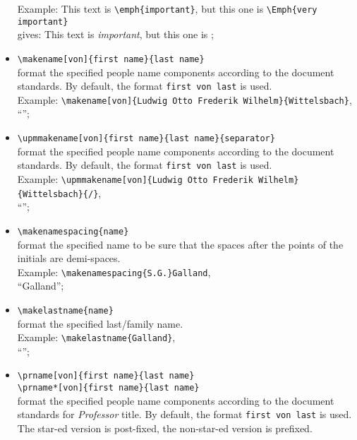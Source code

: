 \documentclass[book]{upmethodology-document}
\begin{document}
\begin{itemize}
	Example: This text is \texttt{{\textbackslash}emph\{important\}}, but this one is \texttt{{\textbackslash}Emph\{very important\}} \\
	gives: This text is \emph{important}, but this one is ;
\item \texttt{{\textbackslash}makename[von]\{first name\}\{last name\}} \\
	format the specified people name components according to the document standards. By default, the format \texttt{first von last} is used. \\
	Example: \texttt{{\textbackslash}makename[von]\{Ludwig Otto Frederik Wilhelm\}\{Wittelsbach\}},\\
		``'';
\item \texttt{{\textbackslash}upmmakename[von]\{first name\}\{last name\}\{separator\}} \\
	format the specified people name components according to the document standards. By default, the format \texttt{first von last} is used. \\
	Example: \texttt{{\textbackslash}upmmakename[von]\{Ludwig Otto Frederik Wilhelm\}\{Wittelsbach\}\{/\}}, \\
		``'';
\item \texttt{{\textbackslash}makenamespacing\{name\}} \\
	format the specified name to be sure that the spaces after the points of the initials are demi-spaces. \\
	Example: \texttt{{\textbackslash}makenamespacing\{S\string.G\string.\}Galland}, \\
		``Galland'';
\item \texttt{{\textbackslash}makelastname\{name\}} \\
	format the specified last/family name. \\
	Example: \texttt{{\textbackslash}makelastname\{Galland\}}, \\
		``'';
\item \texttt{{\textbackslash}prname[von]\{first name\}\{last name\}} \\
      \texttt{{\textbackslash}prname*[von]\{first name\}\{last name\}} \\
	format the specified people name components according to the document standards for \emph{Professor} title. By default, the format \texttt{first von last} is used. The star-ed version is post-fixed, the non-star-ed version is prefixed. \\

\end{itemize}
\end{document}
